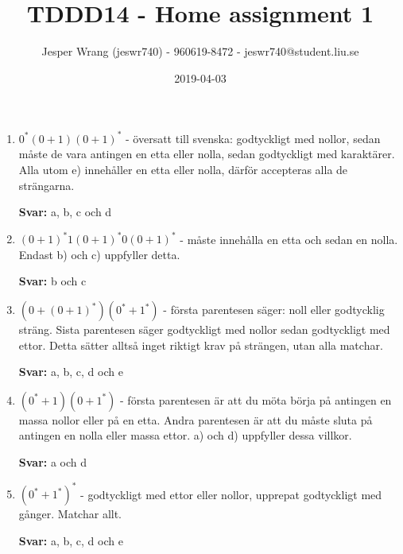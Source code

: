 \documentclass{article}
\title{TDDD14 - Home assignment 1}
\author{Jesper Wrang (jeswr740) - 960619-8472 - jeswr740@student.liu.se}
\date{2019-04-03}
\begin{document}
\maketitle


\section{}

\begin{enumerate}[label=(\alph*)]
    \item $0^*(0+1)(0+1)^*$  - översatt till svenska: godtyckligt med nollor, sedan måste de vara antingen en etta eller nolla, sedan godtyckligt med karaktärer. Alla utom e) innehåller en etta eller nolla, därför accepteras alla de strängarna.

    \textbf{Svar:} a, b, c och d

    \item $(0+1)^*1(0+1)^*0(0+1)^*$ - måste innehålla en etta och sedan en nolla. Endast b) och c) uppfyller detta.

    \textbf{Svar:} b och c

    \item $(0 + (0 + 1)^*)(0^*+1^*)$ - första parentesen säger: noll eller godtycklig sträng. Sista parentesen säger godtyckligt med nollor sedan godtyckligt med ettor. Detta sätter alltså inget riktigt krav på strängen, utan alla matchar.

    \textbf{Svar:} a, b, c, d och e

    \item $(0^*+1)(0+1^*)$ - första parentesen är att du möta börja på antingen en massa nollor eller på en etta. Andra parentesen är att du måste sluta på antingen en nolla eller massa ettor. a) och d) uppfyller dessa villkor.

    \textbf{Svar:} a och d

    \item $(0^*+1^*)^*$ - godtyckligt med ettor eller nollor, upprepat godtyckligt med gånger. Matchar allt. 

    \textbf{Svar:} a, b, c, d och e
\end{enumerate}
\end{document}
